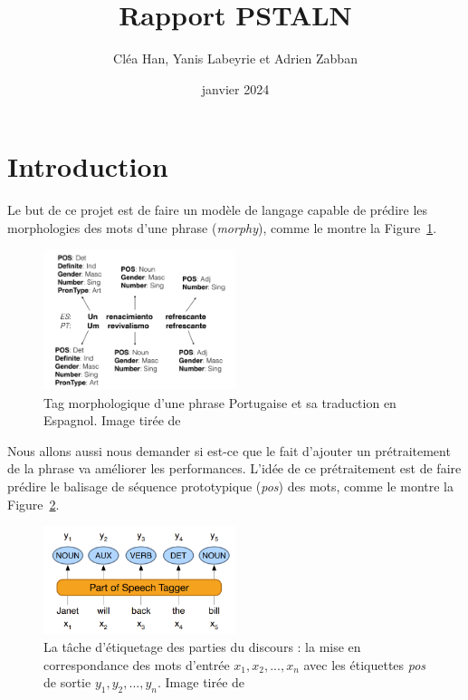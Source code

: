 \documentclass[a4paper]{article}
\title{Rapport PSTALN}
\author{Cléa Han, Yanis Labeyrie et Adrien Zabban}
\date{janvier 2024}
\begin{document}
\maketitle
\tableofcontents

\section{Introduction}

Le but de ce projet est de faire un modèle de langage capable de prédire les morphologies des mots d'une phrase
(\textit{morphy}), comme le montre la Figure~\ref{fig: example morphy}.

\begin{figure}[H]
    \centering
    \includegraphics[width=0.5\textwidth]{morphy.png}
    \caption{Tag morphologique d'une phrase Portugaise et sa traduction en Espagnol.
    Image tirée de~\cite{malaviya-etal-2018-neural}}
    \label{fig: example morphy}
\end{figure}    

Nous allons aussi nous demander si est-ce que le fait d'ajouter un prétraitement de la phrase va améliorer
les performances. L'idée de ce prétraitement est de faire prédire le balisage de séquence
prototypique (\textit{pos}) des mots, comme le montre la Figure~\ref{fig: example pos}.

\begin{figure}[H]
    \centering
    \includegraphics[width=0.5\textwidth]{pos.png}
    \caption{La tâche d'étiquetage des parties du discours : la mise en correspondance des mots d'entrée 
    $x_1, x_2,..., x_n$ avec les étiquettes \textit{pos} de sortie $y_1, y_2,..., y_n$.
    Image tirée de~\cite{pos}}
    \label{fig: example pos}
\end{figure} 
\end{document}
